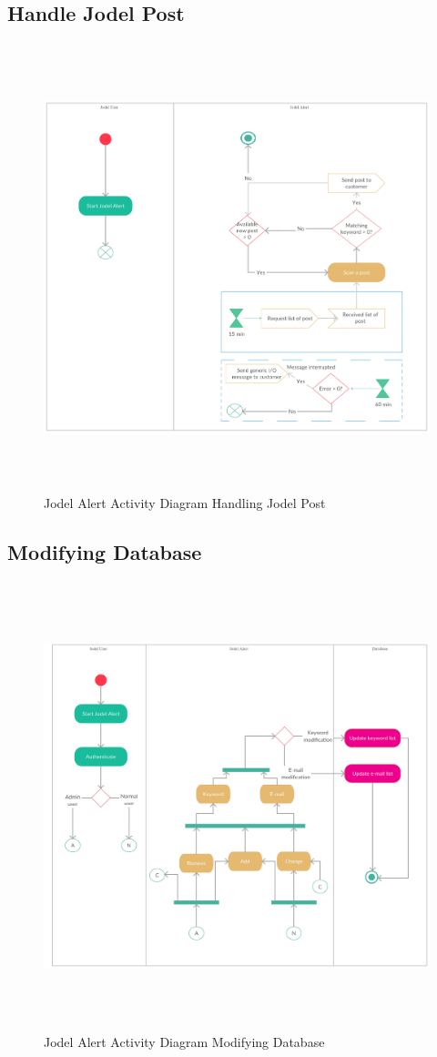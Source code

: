 \documentclass[a4paper,12pt]{article}
\begin{document}
\subsection{Handle Jodel Post}
\begin{figure}[!h]
	\centering
	\includegraphics[height=13cm]{img/Activity_diagram-Handling_Jodel_post.pdf}
	\caption{Jodel Alert Activity Diagram Handling Jodel Post}
	\label{Jodel}
\end{figure}
\clearpage
\subsection{Modifying Database}
\begin{figure}[!h]
	\centering
	\includegraphics[height=13cm]{img/Activity_diagram-Modifying_database.pdf}
	\caption{Jodel Alert Activity Diagram Modifying Database}
	\label{Jodel}
\end{figure}
\clearpage
\end{document}
